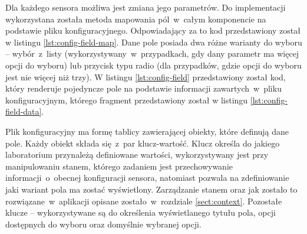 Dla każdego sensora możliwa jest zmiana jego parametrów. Do implementacji wykorzystana została
metoda mapowania pól~w~całym komponencie na podstawie pliku konfiguracyjnego.
Odpowiadający za to kod przedstawiony został w listingu \ref{lst:config-field-map}. Dane pole
posiada dwa różne warianty do wyboru -- wybór~z~listy (wykorzystywany~w~przypadkach, gdy dany
parametr ma więcej opcji do wyboru) lub przycisk typu radio (dla przypadków, gdzie opcji do wyboru
jest nie więcej niż trzy). W listingu \ref{lst:config-field} przedstawiony został kod, który
renderuje pojedyncze pole na podstawie informacji zawartych~w~pliku konfiguracyjnym, którego
fragment przedstawiony został w listingu \ref{lst:config-field-data}.




Plik konfiguracyjny ma formę tablicy zawierającej obiekty, które definują dane pole. Każdy obiekt
składa się~z~par klucz-wartość. Klucz  określa do jakiego laboratorium przynależą
definiowane wartości,  wykorzystywany jest przy manipulowaniu stanem, którego zadaniem
jest przechowywanie informacji~o~obecnej konfiguracji sensora, natomiast  pozwala na
zdefiniowanie jaki wariant pola ma zostać wyświetlony. Zarządzanie stanem oraz jak zostało to
rozwiązane~w~aplikacji opisane zostało~w~rozdziale \ref{sect:context}. Pozostałe klucze --
 wykorzystywane są do określenia wyświetlanego
tytułu pola, opcji dostępnych do wyboru oraz domyślnie wybranej opcji.